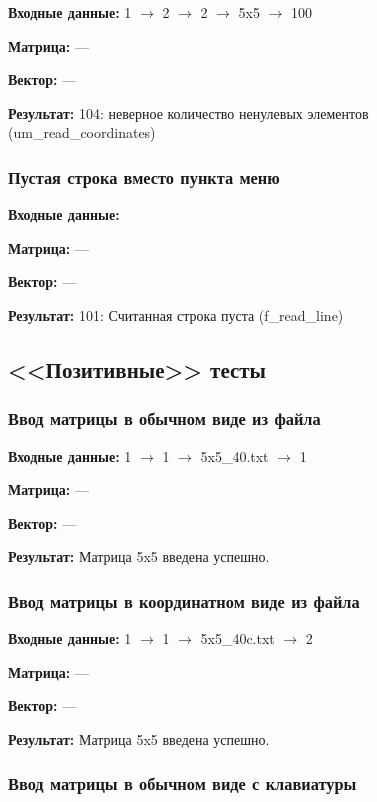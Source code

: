 \documentclass[a4paper,12pt]{extarticle}
\begin{document}
\textbf{Входные данные: }
1 $\rightarrow$ 2 $\rightarrow$ 2 $\rightarrow$ 5x5 $\rightarrow$ 100

\textbf{Матрица: }
---

\textbf{Вектор: }
---

\textbf{Результат: }
104: неверное количество ненулевых элементов (um\_read\_coordinates)

\subsubsection{Пустая строка вместо пункта меню}



\textbf{Входные данные: }


\textbf{Матрица: }
---

\textbf{Вектор: }
---

\textbf{Результат: }
101: Считанная строка пуста (f\_read\_line)

\subsection{<<Позитивные>> тесты}

\subsubsection{Ввод матрицы в обычном виде из файла}

\textbf{Входные данные: }
1 $\rightarrow$ 1 $\rightarrow$ 5x5\_40.txt $\rightarrow$ 1

\textbf{Матрица: }
---

\textbf{Вектор: }
---

\textbf{Результат: }
Матрица 5x5 введена успешно.

\subsubsection{Ввод матрицы в координатном виде из файла}

\textbf{Входные данные: }
1 $\rightarrow$ 1 $\rightarrow$ 5x5\_40c.txt $\rightarrow$ 2

\textbf{Матрица: }
---

\textbf{Вектор: }
---

\textbf{Результат: }
Матрица 5x5 введена успешно.

\subsubsection{Ввод матрицы в обычном виде с клавиатуры}
\end{document}
